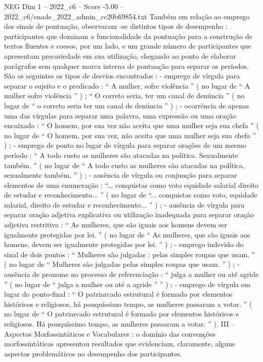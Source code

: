 \begin{textsample}{NEG Dim 1 – 2022\_c6 – Score -5.00 – 2022\_c6/enade\_2022\_admin\_cc20b69854.txt}
Também em relação ao emprego dos sinais de pontuação, observaram -se distintos tipos de desempenho : participantes que dominam a funcionalidade da pontuação para a construção de textos fluentes e coesos, por um lado, e um grande número de participantes que apresentam precariedade em sua utilização, chegando ao ponto de elaborar parágrafos sem qualquer marca interna de pontuação para separar os períodos.
São os seguintes os tipos de desvios encontrados : - emprego de vírgula para separar o sujeito e o predicado : “ A mulher, sofre violência ” ( no lugar de “ A mulher sofre violência ” ) ; “ O correto seria, ter um canal de denúncia ” ( no lugar de “ o correto seria ter um canal de denúncia ” ) ; - ocorrência de apenas uma das vírgulas para separar uma palavra, uma expressão ou uma oração encaixada : “ O homem, por sua vez não aceita que uma mulher seja sua chefa ” ( no lugar de “ O homem, por sua vez, não aceita que uma mulher seja sua chefa ” ) ; - emprego de ponto no lugar de vírgula para separar orações de um mesmo período : “ A todo custo as mulheres são atacadas na política.
Sexualmente também. ” ( no lugar de “ A todo custo as mulheres são atacadas na política, sexualmente também. ” ) ; - ausência de vírgula ou conjunção para separar elementos de uma enumeração : “... conquistas como voto equidade salarial direito de estudar e reconhecimento... ” ( no lugar de “... conquistas como voto, equidade salarial, direito de estudar e reconhecimento... ” ) ; - ausência de vírgula para separar oração adjetiva explicativa ou utilização inadequada para separar oração adjetiva restritiva : “ As mulheres, que são iguais aos homens devem ser igualmente protegidas por lei. ” ( no lugar de “ As mulheres, que são iguais aos homens, devem ser igualmente protegidas por lei. ” ) ; - emprego indevido do sinal de dois pontos : “ Mulheres são julgadas : pelas simples roupas que usam. ” ( no lugar de “ Mulheres são julgadas pelas simples roupas que usam. ” ) ; - ausência de pronome no processo de referenciação : “ julga a mulher ou até agride ” ( no lugar de “ julga a mulher ou até a agride ” ” ) ; - emprego de vírgula em lugar do ponto-final : “ O patriarcado estrutural é formado por elementos históricos e religiosos, há pouquíssimo tempo, as mulheres passaram a votar. ” ( no lugar de “ O patriarcado estrutural é formado por elementos históricos e religiosos.
Há pouquíssimo tempo, as mulheres passaram a votar. ” ).
III – Aspectos Morfossintáticos e Vocabulares : o domínio das convenções morfossintáticas apresentou resultados que evidenciam, claramente, alguns aspectos problemáticos no desempenho dos participantes.

\end{textsample}
